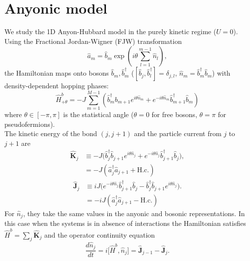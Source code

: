 \documentclass[a4paper, amsfonts, amssymb, amsmath, reprint, showkeys, nofootinbib ,twoside]{revtex4-2}
\begin{document}
\section{Anyonic model} 
We study the 1D Anyon-Hubbard model \cite{Keilmann2011} in the purely kinetic regime ($U = 0$). Using the Fractional Jordan-Wigner (FJW) transformation 
\begin{equation} 
\hat{a}_m = \hat{b}_m \exp\left(i\theta \sum_{l=1}^{m-1} \hat{n}_l\right),
\end{equation} 
the Hamiltonian maps onto bosons $\hat{b}_m, \hat{b}_m^\dagger$ ($[\hat{b}_j, \hat{b}_l^\dagger] = \delta_{j,l}$, $\hat{n}_m = \hat{b}_m^\dagger \hat{b}_m$) with density-dependent hopping phases:
\begin{equation}\label{HamideAny}
\hat{H}^b_{+\theta} = -J \sum_{m=1}^{M-1} \left( \hat{b}_m^\dagger \hat{b}_{m+1} e^{i\theta \hat{n}_m} + e^{-i\theta \hat{n}_m} \hat{b}_{m+1}^\dagger \hat{b}_m \right)
\end{equation} 
where $\theta \in [-\pi, \pi]$ is the statistical angle ($\theta = 0$ for free bosons, $\theta = \pi$ for pseudofermions). \\ 
The kinetic energy of the bond $(j,j+1)$ and the particle current from $j$ to $j+1$ are
\begin{align}
\hat{\mathbf K}_j&\equiv-J\big(\hat b_j^\dagger\hat b_{j+1}e^{i\theta\hat n_j}+e^{-i\theta\hat n_j}\hat b_{j+1}^\dagger\hat b_j\big),\label{eq:Kj}\\
&=-J(\hat a_j^\dagger\hat a_{j+1}+\mathrm{H.c.})
\end{align} 
\begin{align}
\hat{\mathbf J}_j&\equiv iJ\big(e^{-i\theta\hat n_j}\hat b_{j+1}^\dagger\hat b_j-\hat b_j^\dagger\hat b_{j+1}e^{i\theta\hat n_j}\big).\label{eq:Jj}\\
&=-iJ(\hat a_j^\dagger\hat a_{j+1}-\mathrm{H.c.})
\end{align}
For $\hat n_j$, they take the same values in the anyonic and bosonic representations. In this case when the systems is in absence of interactions the Hamiltonian satisfies $\hat H^b=\sum_j\hat{\mathbf K}_j$ and the operator continuity equation
\begin{equation}\label{eq:continuity}
\frac{d\hat n_j}{dt}=i\big[\hat H^b,\hat n_j\big]=\hat{\mathbf J}_{j-1}-\hat{\mathbf J}_j .
\end{equation}
\end{document}
